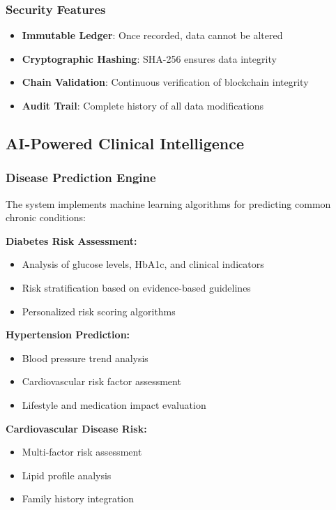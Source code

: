 \documentclass[12pt,a4paper]{article}
\begin{document}
\subsubsection{Security Features}
\begin{itemize}
    \item \textbf{Immutable Ledger}: Once recorded, data cannot be altered
    \item \textbf{Cryptographic Hashing}: SHA-256 ensures data integrity
    \item \textbf{Chain Validation}: Continuous verification of blockchain integrity
    \item \textbf{Audit Trail}: Complete history of all data modifications
\end{itemize}

\subsection{AI-Powered Clinical Intelligence}

\subsubsection{Disease Prediction Engine}

The system implements machine learning algorithms for predicting common chronic conditions:

\textbf{Diabetes Risk Assessment:}
\begin{itemize}
    \item Analysis of glucose levels, HbA1c, and clinical indicators
    \item Risk stratification based on evidence-based guidelines
    \item Personalized risk scoring algorithms
\end{itemize}

\textbf{Hypertension Prediction:}
\begin{itemize}
    \item Blood pressure trend analysis
    \item Cardiovascular risk factor assessment
    \item Lifestyle and medication impact evaluation
\end{itemize}

\textbf{Cardiovascular Disease Risk:}
\begin{itemize}
    \item Multi-factor risk assessment
    \item Lipid profile analysis
    \item Family history integration
\end{itemize}
\end{document}
